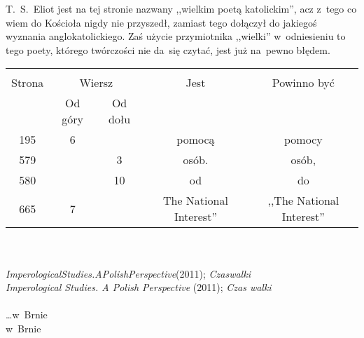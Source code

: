 \documentclass[a4paper,11pt]{article}
\begin{document}



\start {} T.~S.~Eliot jest na tej stronie nazwany ,,wielkim
poetą katolickim'', acz z~tego co wiem do Kościoła nigdy nie
przyszedł, zamiast tego dołączył do jakiegoś wyznania
anglokatolickiego. Zaś użycie przymiotnika ,,wielki'' w~odniesieniu to
tego poety, którego twórczości nie da~się czytać, jest już na~pewno
błędem.

\vspace{\spaceTwo}







\begin{center}
  \begin{tabular}{|c|c|c|c|c|}
    \hline
    & \multicolumn{2}{c|}{} & & \\
    Strona & \multicolumn{2}{c|}{Wiersz} & Jest
                              & Powinno być \\ \cline{2-3}
    & Od góry & Od dołu & & \\
    \hline
    195 &  6 & & pomocą & pomocy \\
    579 & &  3 & osób. & osób, \\
    580 & & 10 & od & do \\
    665 &  7 & & The National Interest'' & ,,The National Interest'' \\
    \hline
  \end{tabular}
\end{center}
\noi \\
 \\
\Jest \emph{ImperologicalStudies.APolishPerspective}(2011);
\emph{Czaswalki} \\
\Powin \emph{Imperological Studies. A Polish Perspective} (2011);
\emph{Czas walki} \\
 \\
\Jest \ldots w~Brnie \\
\Powin  w~Brnie \\
\end{document}
